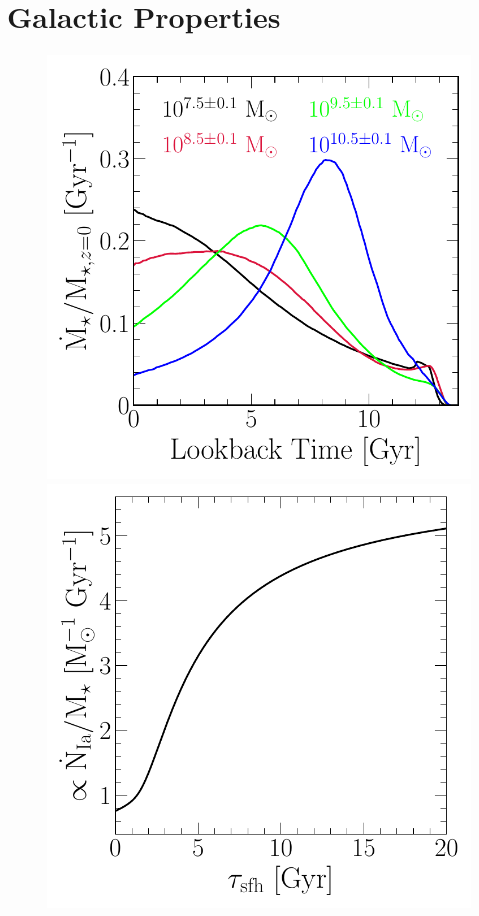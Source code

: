 \documentclass[foo.tex]{subfiles}
\begin{document}
\section{Galactic Properties}
\label{sec:galprops}

\begin{figure}
\centering
\includegraphics[scale = 0.45]{umachine_sfhs.pdf}
\includegraphics[scale = 0.44]{iarate_vs_tausfh.pdf}

\end{figure}
\end{document}
